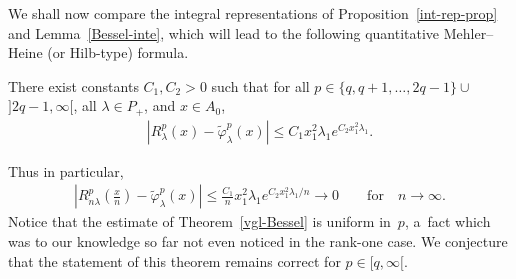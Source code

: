 We shall now compare the integral representations of Proposition~\ref{int-rep-prop} and Lemma~\ref{Bessel-inte}, which
will lead to the following quantitative Mehler--Heine (or Hilb-type) formula.

\begin{Theorem}
\label{vgl-Bessel}
There exist constants $C_1,C_2>0$ such that for all $p\in\{q,q+1,\ldots,2q-1\}\cup$ $] 2q-1,\infty[$, all $\lambda\in
P_+$, and $ x\in A_0$,
\begin{gather*}
\left|R_{\lambda}^p(x)-\widetilde\varphi_\lambda^{p} (x)\right|\leq C_1  x_1^2\lambda_1  e^{C_2 x_1^2\lambda_1}.
\end{gather*}
\end{Theorem}
Thus in particular,
\begin{gather*}
\left|R_{n\lambda}^p \left(\frac{x}{n}\right)-\widetilde\varphi_\lambda^{p}(x)\right|\leq \frac{C_1}{n}
x_1^2\lambda_1  e^{C_2 x_1^2\lambda_1/n} \to 0
\qquad
\text{for}
\quad
n\to \infty.
\end{gather*}
Notice that the estimate of Theorem~\ref{vgl-Bessel} is uniform in~$p$, a~fact which was to our knowledge so far not
even noticed in the rank-one case.
We conjecture that the statement of this theorem remains correct for $p\in [q,\infty[$.
